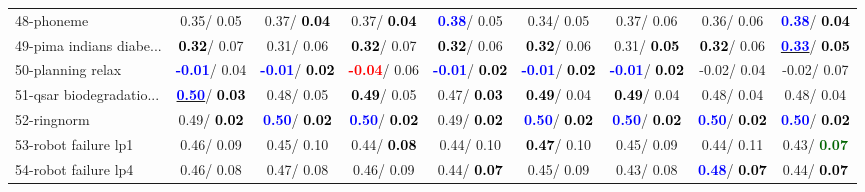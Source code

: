 \begin{table}[h]
\begin{center}
\begin{tabular}{lc|c|c|c|c|c|c|c}
48-phoneme &   0.35/  0.05 &   0.37/\textcolor{black}{\textbf{  0.04}} &   0.37/\textcolor{black}{\textbf{  0.04}} & \textcolor{blue}{\textbf{  0.38}}/  0.05 &   0.34/  0.05 &   0.37/  0.06 &   0.36/  0.06 & \textcolor{blue}{\textbf{  0.38}}/\textcolor{black}{\textbf{  0.04}} \\
49-pima indians diabe... & \textcolor{black}{\textbf{  0.32}}/  0.07 &   0.31/  0.06 & \textcolor{black}{\textbf{  0.32}}/  0.07 & \textcolor{black}{\textbf{  0.32}}/  0.06 & \textcolor{black}{\textbf{  0.32}}/  0.06 &   0.31/\textcolor{black}{\textbf{  0.05}} & \textcolor{black}{\textbf{  0.32}}/  0.06 & \underline{\textcolor{blue}{\textbf{  0.33}}}/\textcolor{black}{\textbf{  0.05}} \\
50-planning relax & \textcolor{blue}{\textbf{ -0.01}}/  0.04 & \textcolor{blue}{\textbf{ -0.01}}/\textcolor{black}{\textbf{  0.02}} & \textcolor{red}{\textbf{ -0.04}}/  0.06 & \textcolor{blue}{\textbf{ -0.01}}/\textcolor{black}{\textbf{  0.02}} & \textcolor{blue}{\textbf{ -0.01}}/\textcolor{black}{\textbf{  0.02}} & \textcolor{blue}{\textbf{ -0.01}}/\textcolor{black}{\textbf{  0.02}} &  -0.02/  0.04 &  -0.02/  0.07 \\
51-qsar biodegradatio... & \underline{\textcolor{blue}{\textbf{  0.50}}}/\textcolor{black}{\textbf{  0.03}} &   0.48/  0.05 & \textcolor{black}{\textbf{  0.49}}/  0.05 &   0.47/\textcolor{black}{\textbf{  0.03}} & \textcolor{black}{\textbf{  0.49}}/  0.04 & \textcolor{black}{\textbf{  0.49}}/  0.04 &   0.48/  0.04 &   0.48/  0.04 \\
52-ringnorm &   0.49/\textcolor{black}{\textbf{  0.02}} & \textcolor{blue}{\textbf{  0.50}}/\textcolor{black}{\textbf{  0.02}} & \textcolor{blue}{\textbf{  0.50}}/\textcolor{black}{\textbf{  0.02}} &   0.49/\textcolor{black}{\textbf{  0.02}} & \textcolor{blue}{\textbf{  0.50}}/\textcolor{black}{\textbf{  0.02}} & \textcolor{blue}{\textbf{  0.50}}/\textcolor{black}{\textbf{  0.02}} & \textcolor{blue}{\textbf{  0.50}}/\textcolor{black}{\textbf{  0.02}} & \textcolor{blue}{\textbf{  0.50}}/\textcolor{black}{\textbf{  0.02}} \\
53-robot failure lp1 &   0.46/  0.09 &   0.45/  0.10 &   0.44/\textcolor{black}{\textbf{  0.08}} &   0.44/  0.10 & \textcolor{black}{\textbf{  0.47}}/  0.10 &   0.45/  0.09 &   0.44/  0.11 &   0.43/\textcolor{darkgreen}{\textbf{  0.07}} \\ \hline
54-robot failure lp4 &   0.46/  0.08 &   0.47/  0.08 &   0.46/  0.09 &   0.44/\textcolor{black}{\textbf{  0.07}} &   0.45/  0.09 &   0.43/  0.08 & \textcolor{blue}{\textbf{  0.48}}/\textcolor{black}{\textbf{  0.07}} &   0.44/\textcolor{black}{\textbf{  0.07}} \\

\end{tabular}
\end{center}
\end{table}
